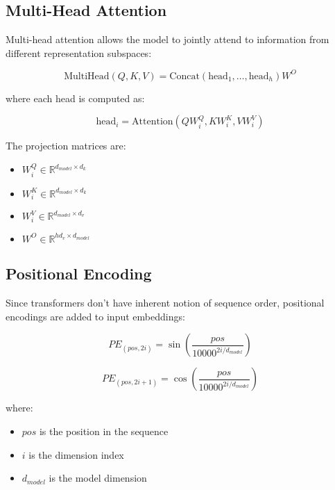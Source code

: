 \documentclass[12pt,a4paper]{article}
\begin{document}
\subsection{Multi-Head Attention}

Multi-head attention allows the model to jointly attend to information from different representation subspaces:

\begin{equation}
\text{MultiHead}(Q, K, V) = \text{Concat}(\text{head}_1, \ldots, \text{head}_h)W^O
\end{equation}

where each head is computed as:

\begin{equation}
\text{head}_i = \text{Attention}(QW_i^Q, KW_i^K, VW_i^V)
\end{equation}

The projection matrices are:
\begin{itemize}
    \item $W_i^Q \in \mathbb{R}^{d_{model} \times d_k}$
    \item $W_i^K \in \mathbb{R}^{d_{model} \times d_k}$
    \item $W_i^V \in \mathbb{R}^{d_{model} \times d_v}$
    \item $W^O \in \mathbb{R}^{hd_v \times d_{model}}$
\end{itemize}

\subsection{Positional Encoding}

Since transformers don't have inherent notion of sequence order, positional encodings are added to input embeddings:

\begin{equation}
PE_{(pos, 2i)} = \sin\left(\frac{pos}{10000^{2i/d_{model}}}\right)
\end{equation}

\begin{equation}
PE_{(pos, 2i+1)} = \cos\left(\frac{pos}{10000^{2i/d_{model}}}\right)
\end{equation}

where:
\begin{itemize}
    \item $pos$ is the position in the sequence
    \item $i$ is the dimension index
    \item $d_{model}$ is the model dimension
\end{itemize}
\end{document}
